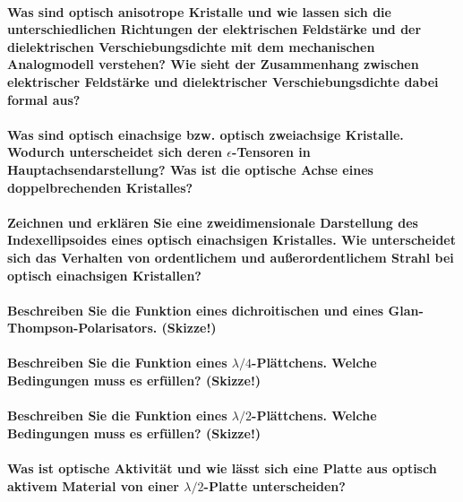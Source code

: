 \documentclass[a4paper, 11pt, ngerman, parskip=half]{scrartcl}
\begin{document}
\paragraph{Was sind optisch anisotrope Kristalle und wie lassen sich die unterschiedlichen
Richtungen der elektrischen Feldstärke und der dielektrischen Verschiebungsdichte mit dem
mechanischen Analogmodell verstehen? Wie sieht der Zusammenhang zwischen elektrischer Feldstärke und dielektrischer Verschiebungsdichte dabei formal aus?}

\paragraph{Was sind optisch einachsige bzw. optisch zweiachsige Kristalle. Wodurch unterscheidet
sich deren $\epsilon$-Tensoren in Hauptachsendarstellung? Was ist die optische Achse eines
doppelbrechenden Kristalles?}

\paragraph{Zeichnen und erklären Sie eine zweidimensionale Darstellung des Indexellipsoides eines
optisch einachsigen Kristalles. Wie unterscheidet sich das Verhalten von ordentlichem und
außerordentlichem Strahl bei optisch einachsigen Kristallen?}

\paragraph{Beschreiben Sie die Funktion eines dichroitischen und eines Glan-Thompson-Polarisators.
(Skizze!)}

\paragraph{Beschreiben Sie die Funktion eines $\lambda/4$-Plättchens. Welche Bedingungen muss es
erfüllen? (Skizze!)}

\paragraph{Beschreiben Sie die Funktion eines $\lambda/2$-Plättchens. Welche Bedingungen muss es
erfüllen? (Skizze!)}

\paragraph{Was ist optische Aktivität und wie lässt sich eine Platte aus optisch aktivem Material
von einer $\lambda/2$-Platte unterscheiden?}
\end{document}
